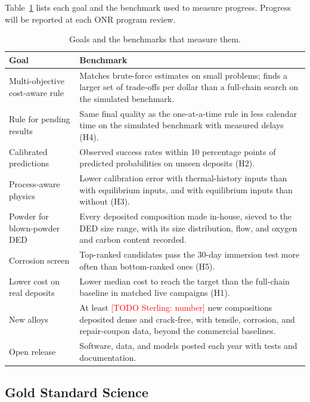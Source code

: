 \documentclass[12pt,letterpaper]{article}
\newcommand{\todo}[1]{\textcolor{red}{[TODO Sterling: #1]}}
\begin{document}
Table~\ref{tab:goals} lists each goal and the benchmark used to measure
progress. Progress will be reported at each ONR program review.

\begin{table}[h]
\centering
\caption{Goals and the benchmarks that measure them.}
\label{tab:goals}
\renewcommand{\arraystretch}{1.15}
\begin{tabularx}{\textwidth}{@{}>{\raggedright\arraybackslash}p{1.75in}>{\raggedright\arraybackslash}X@{}}
\toprule
\textbf{Goal} & \textbf{Benchmark} \\
\midrule
Multi-objective cost-aware rule & Matches brute-force estimates
on small problems; finds a larger set of trade-offs per dollar than a
full-chain search on the simulated benchmark. \\
Rule for pending results & Same final quality as the one-at-a-time rule in
less calendar time on the simulated benchmark with measured delays (H4). \\
Calibrated predictions & Observed success rates within 10 percentage points
of predicted probabilities on unseen deposits (H2). \\
Process-aware physics & Lower calibration error with thermal-history inputs
than with equilibrium inputs, and with equilibrium inputs than without (H3). \\
Powder for blown-powder DED & Every deposited composition made in-house,
sieved to the DED size range, with its size distribution, flow, and oxygen
and carbon content recorded. \\
Corrosion screen & Top-ranked candidates pass the 30-day immersion test
more often than bottom-ranked ones (H5). \\
Lower cost on real deposits & Lower median cost to reach the target than the
full-chain baseline in matched live campaigns (H1). \\
New alloys & At least \todo{number} new compositions deposited dense and
crack-free, with tensile, corrosion, and repair-coupon data, beyond the
commercial baselines. \\
Open release & Software, data, and models posted each year with tests and
documentation. \\
\bottomrule
\end{tabularx}
\end{table}

\subsection{Gold Standard Science}
\end{document}
